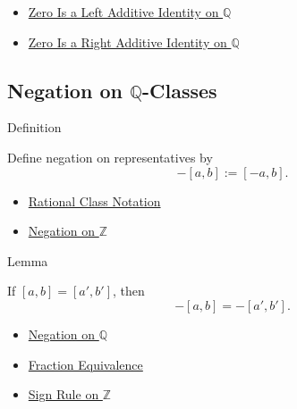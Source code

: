 \begin{dependencies}
\begin{itemize}
  \item \hyperref[thm:zero-left-additive-identity-on-q]{Zero Is a Left Additive Identity on $\mathbb{Q}$}
  \item \hyperref[cor:zero-right-additive-identity-on-q]{Zero Is a Right Additive Identity on $\mathbb{Q}$}
\end{itemize}
\end{dependencies}

\subsection*{Negation on $\mathbb{Q}$-Classes}

\begin{definitionbox}{Definition}
\begin{definition}
\label{def:negation-on-q-classes}
Define negation on representatives by
\[
-[a,b]:=[-a,b].
\]
\end{definition}
\end{definitionbox}

\begin{dependencies}
\begin{itemize}
  \item \hyperref[def:rational-class-notation]{Rational Class Notation}
  \item \hyperref[def:negation-on-z-classes]{Negation on $\mathbb{Z}$}
\end{itemize}
\end{dependencies}

\begin{lemmabox}{Lemma}
\begin{lemma}
\label{lem:negation-on-q-respects-equivalence}
If $[a,b]=[a',b']$, then
\[
-[a,b]=-[a',b'].
\]
\end{lemma}
\end{lemmabox}

\begin{dependencies}
\begin{itemize}
  \item \hyperref[def:negation-on-q-classes]{Negation on $\mathbb{Q}$}
  \item \hyperref[def:fraction-equivalence]{Fraction Equivalence}
  \item \hyperref[cor:sign-rule-on-z]{Sign Rule on $\mathbb{Z}$}
\end{itemize}
\end{dependencies}

